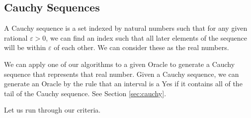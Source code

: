 \documentclass[12pt]{article}
\begin{document}
\subsection{Cauchy Sequences}

A Cauchy sequence is a set indexed by natural numbers such that for any given rational $\varepsilon > 0$, we can find an index such that all later elements of the sequence will be within $\varepsilon$ of each other. We can consider these as the real numbers. 

We can apply one of our algorithms to a given Oracle to generate a Cauchy sequence that represents that real number. Given a Cauchy sequence, we can generate an Oracle by the rule that an interval is a Yes if it contains all of the tail of the Cauchy sequence. See Section \ref{sec:cauchy}.

Let us run through our criteria. 
\end{document}
